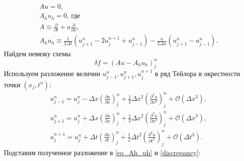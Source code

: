 \documentclass[12pt,a4paper]{article}
\begin{document}
	\begin{align}
		& Au = 0, \\
		& A_h u_h = 0, \, \text{где} \\
		& A \equiv \frac{\partial}{\partial t} + a\frac{\partial}{\partial x}, \\
		& A_h u_h \equiv \frac{1}{2 \Delta t}\left(u_{j+1}^n -2u_j^{n+1} + u_{j-1}^n\right) - \frac{a}{2\Delta x}\left(u_{j+1}^n - u_{j-1}^n\right).\label{eq_Ah_uh}
	\end{align}
	Найдем невязку схемы
	\begin{equation}\label{discrepancy}
		\delta f = (Au - A_hu_h)_j^n 
	\end{equation}
	Используем разложение величин $u_{j-1}^n, u_{j+1}^n, u_{j}^{n+1}$ в ряд Тейлора в окрестности точки $(x_j, t^n)$:
	\begin{align}
		& u_{j-1}^n = u_j^n - \Delta x\left(\frac{\partial u}{\partial x}\right)_j^n + \frac{1}{2}\Delta x^2\left(\frac{\partial^2 u}{\partial x^2}\right)_j^n + \mathcal{O}\left(\Delta x^3\right), \\
		& u_{j+1}^n = u_j^n + \Delta x\left(\frac{\partial u}{\partial x}\right)_j^n + \frac{1}{2}\Delta x^2\left(\frac{\partial^2 u}{\partial x^2}\right)_j^n + \mathcal{O}\left(\Delta x^3\right), \\
		& u_{j}^{n+1} = u_j^n + \Delta t\left(\frac{\partial u}{\partial t}\right)_j^n + \frac{1}{2}\Delta t^2\left(\frac{\partial^2 u}{\partial t^2}\right)_j^n + \mathcal{O}\left(\Delta t^3\right). 
	\end{align}
	Подставим полученное разложение в \eqref{eq_Ah_uh} и \eqref{discrepancy}:
\end{document}
